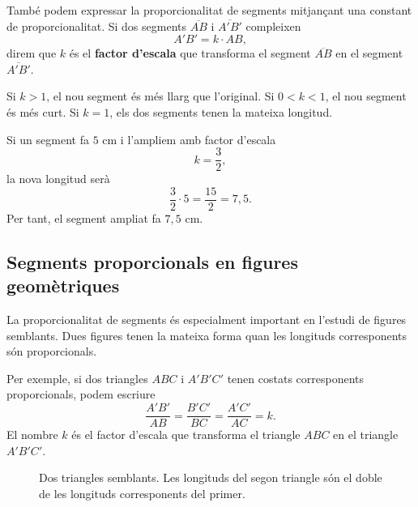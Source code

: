 També podem expressar la proporcionalitat de segments mitjançant una constant de proporcionalitat. Si dos segments \(\overline{AB}\) i \(\overline{A'B'}\) compleixen
\[
	A'B'=k\cdot AB,
\]
direm que \(k\) és el \textbf{factor d'escala} que transforma el segment \(\overline{AB}\) en el segment \(\overline{A'B'}\).

Si \(k>1\), el nou segment és més llarg que l'original. Si \(0<k<1\), el nou segment és més curt. Si \(k=1\), els dos segments tenen la mateixa longitud.

\begin{exemple}
Si un segment fa \(5\) cm i l'ampliem amb factor d'escala
\[
	k=\frac{3}{2},
\]
la nova longitud serà
\[
	\frac{3}{2}\cdot 5=\frac{15}{2}=7{,}5.
\]
Per tant, el segment ampliat fa \(7{,}5\) cm.
\end{exemple}

\subsection{Segments proporcionals en figures geomètriques}

La proporcionalitat de segments és especialment important en l'estudi de figures semblants. Dues figures tenen la mateixa forma quan les longituds corresponents són proporcionals.

Per exemple, si dos triangles \(ABC\) i \(A'B'C'\) tenen costats corresponents proporcionals, podem escriure
\[
	\frac{A'B'}{AB}
	=
	\frac{B'C'}{BC}
	=
	\frac{A'C'}{AC}
	=
	k.
\]
El nombre \(k\) és el factor d'escala que transforma el triangle \(ABC\) en el triangle \(A'B'C'\).

\begin{figure}[htbp]
\centering
{}
\caption{Dos triangles semblants. Les longituds del segon triangle són el doble de les longituds corresponents del primer.}
\label{fig:triangles-semblants}
\end{figure}

